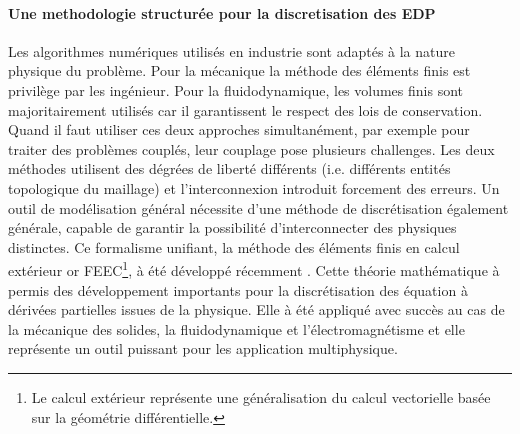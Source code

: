 \documentclass[12pt, french]{article}
\begin{document}
\paragraph{\large Une methodologie structurée pour la discretisation des EDP\\}
Les algorithmes numériques utilisés en industrie sont adaptés à la nature physique du problème. Pour la mécanique la méthode des éléments finis est privilège par les ingénieur. Pour la fluidodynamique, les volumes finis sont majoritairement utilisés car il garantissent le respect des lois de conservation. Quand il faut utiliser ces deux approches simultanément, par exemple pour traiter des problèmes couplés, leur couplage pose plusieurs challenges. Les deux méthodes utilisent des dégrées de liberté différents (i.e. différents entités topologique du maillage) et l'interconnexion introduit forcement des erreurs. Un outil de modélisation général nécessite d'une méthode de discrétisation également générale, capable de  garantir la possibilité d'interconnecter des physiques distinctes. Ce formalisme unifiant, la méthode des éléments finis en calcul extérieur or FEEC\footnote{Le calcul extérieur représente une généralisation du calcul vectorielle basée sur la géométrie différentielle.},  à été développé récemment \cite{arnold2006acta}. Cette théorie mathématique à permis des développement importants pour la discrétisation des équation à dérivées partielles issues de la physique. Elle à été appliqué avec succès au cas de la mécanique des solides, la fluidodynamique et l'électromagnétisme et elle représente un outil puissant pour les application multiphysique. 
\end{document}
